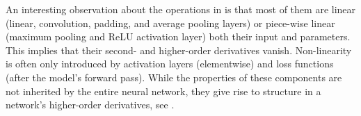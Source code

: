 An interesting observation about the operations in
 is that most of them are linear (linear,
convolution, padding, and average pooling layers) or piece-wise linear (maximum
pooling and ReLU activation layer) \wrt both their input and parameters. This
implies that their second- and higher-order derivatives vanish. Non-linearity is
often only introduced by activation layers (elementwise) and loss functions
(after the model's forward pass). While the properties of these components are
not inherited by the entire neural network, they give rise to structure in a
network's higher-order derivatives, see \eg {}.


